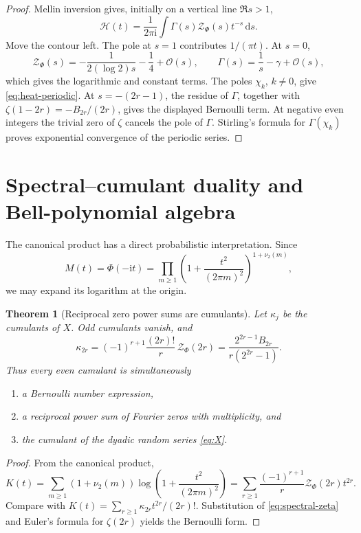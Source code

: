 \documentclass[11pt,oneside]{article}
\newtheorem{theorem}{Theorem}[section]
\theoremstyle{definition}
\theoremstyle{remark}
\newcommand{\ii}{\mathrm i}
\newcommand{\dd}{\,\mathrm d}
\newcommand{\bigO}{\mathcal O}
\begin{document}
\begin{proof}
Mellin inversion gives, initially on a vertical line \(\Re s>1\),
\[
 \mathcal H(t)
 =\frac1{2\pi\ii}\int
   \Gamma(s)\mathcal Z_\Phi(s)t^{-s}\dd s.
\]
Move the contour left.  The pole at \(s=1\) contributes \(1/(\pi t)\).
At \(s=0\),
\[
 \mathcal Z_\Phi(s)
 =-\frac1{2(\log2)s}-\frac14+\bigO(s),
 \qquad
 \Gamma(s)=\frac1s-\gamma+\bigO(s),
\]
which gives the logarithmic and constant terms.  The poles
\(\chi_k\), \(k\neq0\), give \eqref{eq:heat-periodic}.  At
\(s=-(2r-1)\), the residue of \(\Gamma\), together with
\(\zeta(1-2r)=-B_{2r}/(2r)\), gives the displayed Bernoulli term.  At
negative even integers the trivial zero of \(\zeta\) cancels the pole of
\(\Gamma\).  Stirling's formula for \(\Gamma(\chi_k)\) proves exponential
convergence of the periodic series.
\end{proof}

\section{Spectral--cumulant duality and Bell-polynomial algebra}

The canonical product has a direct probabilistic interpretation.  Since
\[
 M(t)=\Phi(-\ii t)
 =\prod_{m\geq1}
  \left(1+\frac{t^2}{(2\pi m)^2}\right)^{1+\nu_2(m)},
\]
we may expand its logarithm at the origin.

\begin{theorem}[Reciprocal zero power sums are cumulants]
\label{thm:cumulants}
Let \(\kappa_j\) be the cumulants of \(X\).  Odd cumulants vanish, and
\begin{equation}
 \boxed{\displaystyle
 \kappa_{2r}
 =(-1)^{r+1}\frac{(2r)!}{r}\,
  \mathcal Z_\Phi(2r)
 =\frac{2^{2r-1}B_{2r}}{r(2^{2r}-1)}.}
 \label{eq:cumulants}
\end{equation}
Thus every even cumulant is simultaneously
\begin{enumerate}[label=(\roman*),leftmargin=2.5em]
\item a Bernoulli number expression,
\item a reciprocal power sum of Fourier zeros with multiplicity, and
\item the cumulant of the dyadic random series \eqref{eq:X}.
\end{enumerate}
\end{theorem}

\begin{proof}
From the canonical product,
\[
 K(t)
 =\sum_{m\geq1}(1+\nu_2(m))
  \log\!\left(1+\frac{t^2}{(2\pi m)^2}\right)
 =\sum_{r\geq1}\frac{(-1)^{r+1}}r
   \mathcal Z_\Phi(2r)t^{2r}.
\]
Compare with
\(K(t)=\sum_{r\geq1}\kappa_{2r}t^{2r}/(2r)!\).
Substitution of \eqref{eq:spectral-zeta} and Euler's formula for
\(\zeta(2r)\) yields the Bernoulli form.
\end{proof}
\end{document}
